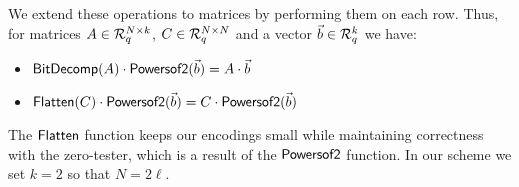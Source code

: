 We extend these operations to matrices by performing them on each row.  Thus, for matrices $A \in \mathcal{R}_q^{N \times k}$, $C \in \mathcal{R}_q^{N \times N}$ and a vector $\vec{b} \in \mathcal{R}_q^k$ we have:

\begin{itemize}
\item $\mathsf{BitDecomp}(A)\cdot\mathsf{Powersof2}(\vec{b}) = A\cdot\vec{b}$
\item $\mathsf{Flatten}(C)\cdot\mathsf{Powersof2}(\vec{b}) = C\cdot\mathsf{Powersof2}(\vec{b})$
\end{itemize}

The $\mathsf{Flatten}$ function keeps our encodings small while maintaining correctness with the zero-tester, which is a result of the $\mathsf{Powersof2}$ function.  In our scheme we set $k = 2$ so that $N = 2\ell$.